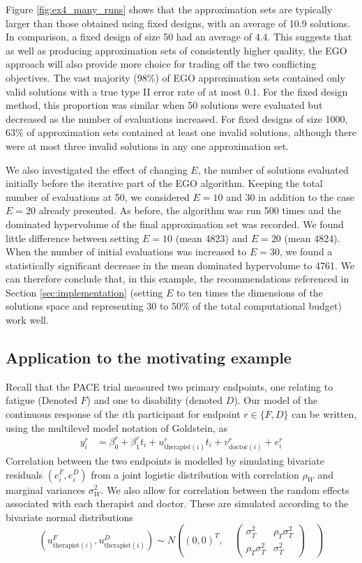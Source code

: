 \documentclass[sagev, Crown]{sagej}
\begin{document}
Figure \ref{fig:ex4_many_runs} shows that the approximation sets are typically larger than those obtained using fixed designs, with an average of 10.9 solutions. In comparison, a fixed design of size 50 had an average of 4.4. This suggests that as well as producing approximation sets of consistently higher quality, the EGO approach will also provide more choice for trading off the two conflicting objectives. The vast majority (98\%) of EGO approximation sets contained only valid solutions with a true type II error rate of at most 0.1. For the fixed design method, this proportion was similar when 50 solutions were evaluated but decreased as the number of evaluations increased. For fixed designs of size 1000, 63\% of approximation sets contained at least one invalid solutions, although there were at most three invalid solutions in any one approximation set.

We also investigated the effect of changing $E$, the number of solutions evaluated initially before the iterative part of the EGO algorithm. Keeping the total number of evaluations at 50, we considered $E = 10$ and 30 in addition to the case $E = 20$ already presented. As before, the algorithm was run 500 times and the dominated hypervolume of the final approximation set was recorded. We found little difference between setting $E = 10$ (mean 4823) and $E = 20$ (mean 4824). When the number of initial evaluations was increased to $E = 30$, we found a statistically significant decrease in the mean dominated hypervolume to 4761. We can therefore conclude that, in this example, the recommendations referenced in Section \ref{sec:implementation} (setting $E$ to ten times the dimensions of the solutions space and representing 30 to 50\% of the total computational budget) work well.

\subsection{Application to the motivating example}

Recall that the PACE trial measured two primary endpoints, one relating to fatigue (Denoted $F$) and one to disability (denoted $D$). Our model of the continuous response of the $i$th participant for endpoint $r \in \{F, D\}$ can be written, using the multilevel model notation of Goldstein\cite{Goldstein2003}, as
\begin{align}\label{eqn:ex1_model}
y^r_i &= \beta_{0}^r + \beta_1^r t_i + u_{\text{therapist}(i)}^{r}t_{i} + v_{\text{doctor}(i)}^{r} + e_i^r 
\end{align}
Correlation between the two endpoints is modelled by simulating bivariate residuals $(e_i^F, e_i^D)$ from a joint logistic distribution with correlation $\rho_W$ and marginal variances $\sigma_W^2$. We also allow for correlation between the random effects associated with each therapist and doctor. These are simulated according to the bivariate normal distributions
$$
(u_{\text{therapist}(i)}^F, u_{\text{therapist}(i)}^D) \sim N\left( (0,0)^T, \quad
\begin{pmatrix} 
\sigma_T^2 & \rho_T \sigma_T^2 \\
\rho_T \sigma_T^2  & \sigma_T^2 
\end{pmatrix}
\quad \right)
$$
\end{document}
